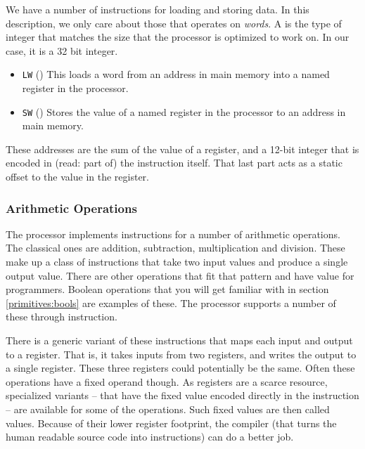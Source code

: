 We have a number of instructions for loading and storing data. In this description, we only care about those that operates on \textsl{words}. A  is the type of integer that matches the size that the processor is optimized to work on. In our case, it is a 32 bit integer.
\begin{itemize}
  \item \texttt{LW} () This loads a word from an address in main memory into a named register in the processor.
  \item \texttt{SW} () Stores the value of a named register in the processor to an address in main memory.
\end{itemize}
These addresses are the sum of the value of a register, and a 12-bit integer that is encoded in (read: part of) the instruction itself. That last part acts as a static offset to the value in the register.

\subsubsection{Arithmetic Operations}

The processor implements instructions for a number of arithmetic operations. The classical ones are addition, subtraction, multiplication and division. These make up a class of instructions that take two input values and produce a single output value. There are other operations that fit that pattern and have value for programmers. Boolean operations that you will get familiar with in section \ref{primitives:bools} are examples of these. The processor supports a number of these through instruction.

There is a generic variant of these instructions that maps each input and output to a register. That is, it takes inputs from two registers, and writes the output to a single register. These three registers could potentially be the same. Often these operations have a fixed operand though. As registers are a scarce resource, specialized variants -- that have the fixed value encoded directly in the instruction -- are available for some of the operations. Such fixed values are then called  values. Because of their lower register footprint, the compiler (that turns the human readable source code into instructions) can do a better job.

